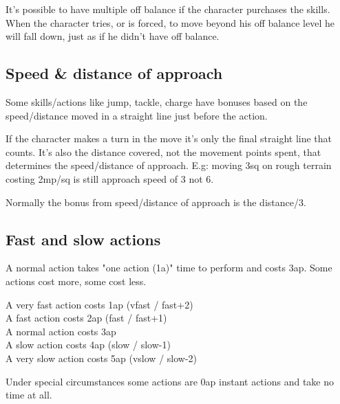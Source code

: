 It's possible to have multiple off balance if the character purchases the skills.
When the character tries, or is forced, to move beyond his off balance level he will fall down, just as if he didn't have off balance.


\subsection*{Speed \& distance of approach}
\label{sec:approach}
Some skills/actions like jump, tackle, charge have bonuses based on the speed/distance moved in a straight line just before the action.

If the character makes a turn in the move it's only the final straight line that counts. It's also the distance covered, not the movement points spent, that determines the speed/distance of approach. E.g: moving 3sq on rough terrain costing 2mp/sq is still approach speed of 3 not 6.

Normally the bonus from speed/distance of approach is the distance/3.















\subsection*{Fast and slow actions}
A normal action takes "one action (1a)" time to perform and costs 3ap. Some actions cost more, some cost less.

\noindent
A very fast action costs 1ap (vfast / fast+2) \\
A fast action costs 2ap (fast / fast+1) \\
A normal action costs 3ap \\
A slow action costs 4ap (slow / slow-1) \\
A very slow action costs 5ap (vslow / slow-2)

\noindent
Under special circumstances some actions are 0ap instant actions and take no time at all.


